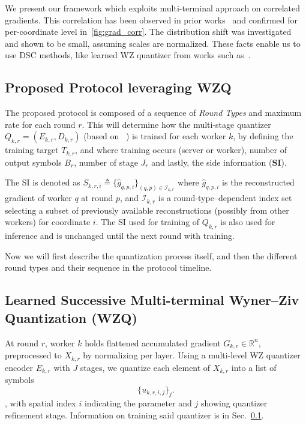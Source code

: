 We present our framework which exploits multi-terminal approach on correlated gradients. This correlation has been observed in prior works~\cite{ZhangTao2022, Abrahamyan2022LGC} and confirmed for per-coordinate level in~\ref{fig:grad_corr}. The distribution shift was investigated and shown to be small, assuming scales are normalized. These facts enable us to use DSC methods, like learned WZ quantizer from works such as~\cite{BorisLayeredWZ, OzywzRecoverBinning}.


\subsection{Proposed Protocol leveraging WZQ}
\label{subsec:method-protocols}
The proposed protocol is composed of a sequence of \emph{Round Types} and maximum rate for each round \(r\). This will determine how the multi-stage quantizer  \(Q_{k,r} = (E_{k,r}, D_{k,r})\) (based on ~\cite{BorisLayeredWZ,OzywzRecoverBinning}) is trained for each worker \(k\), by defining the training target \(T_{k,r}\), and where training occurs (server or worker), number of output symbols \(B_{r}\), number of stage \(J_{r}\) and lastly, the side information (\textbf{SI}).

The SI is denoted as \(S_{k,r,i} \triangleq \{\hat g_{q,p,i}\}_{(q,p)\in \mathcal{I}_{k,r}}\) where \(\hat g_{q,p,i}\) is the reconstructed gradient of worker \(q\) at round \(p\), and $\mathcal{I}_{k,r}$ is a round-type–dependent index set selecting a subset of previously available reconstructions (possibly from other workers) for coordinate $i$. The SI used for training of \(Q_{k,r}\) is also used for inference and is unchanged until the next round with training.

Now we will first describe the quantization process itself, and then the different round types and their sequence in the protocol timeline.

\subsection{Learned Successive Multi-terminal Wyner--Ziv Quantization (WZQ)}
\label{subsec:method-lsmtwzq}
At round \(r\), worker \(k\) holds flattened accumulated gradient \(G_{k,r}\in\mathbb{R}^n\), preprocessed to \(X_{k,r}\) by normalizing per layer.
Using a multi-level WZ quantizer encoder \(E_{k,r}\) with \(J\) stages, we quantize each element of \(X_{k,r}\) into a list of symbols \[\{u_{k,r,i,j}\}_{j}.\], with spatial index \(i\) indicating the parameter and \(j\) showing quantizer refinement stage.
Information on training said quantizer is in Sec.~\ref{subsec:method-protocols}.

